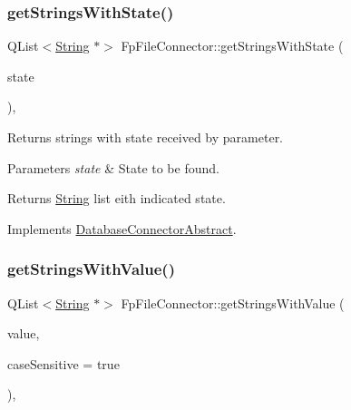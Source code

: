 \mbox{\label{classFpFileConnector_a4c671329fd2fd1b9c3a7d72de1028afd}} 
\subsubsection{\texorpdfstring{get\+Strings\+With\+State()}{getStringsWithState()}}
{\footnotesize\ttfamily Q\+List$<$\mbox{\hyperlink{classString}{String}} $\ast$$>$ Fp\+File\+Connector\+::get\+Strings\+With\+State (\begin{DoxyParamCaption}\item[{const Q\+String}]{state }\end{DoxyParamCaption})\hspace{0.3cm}{\ttfamily [override]}, {\ttfamily [virtual]}}



Returns strings with state received by parameter. 


\begin{DoxyParams}{Parameters}
{\em state} & State to be found. \\
\hline
\end{DoxyParams}
\begin{DoxyReturn}{Returns}
\mbox{\hyperlink{classString}{String}} list eith indicated state. 
\end{DoxyReturn}


Implements \mbox{\hyperlink{classDatabaseConnectorAbstract_a74952c7e14c891e33c84995066003c5a}{Database\+Connector\+Abstract}}.

\mbox{\label{classFpFileConnector_a72a6ca5a5b8a44783d2ed990b111675b}} 
\subsubsection{\texorpdfstring{get\+Strings\+With\+Value()}{getStringsWithValue()}}
{\footnotesize\ttfamily Q\+List$<$\mbox{\hyperlink{classString}{String}} $\ast$$>$ Fp\+File\+Connector\+::get\+Strings\+With\+Value (\begin{DoxyParamCaption}\item[{const Q\+String \&}]{value,  }\item[{bool}]{case\+Sensitive = {\ttfamily true} }\end{DoxyParamCaption})\hspace{0.3cm}{\ttfamily [override]}, {\ttfamily [virtual]}}



